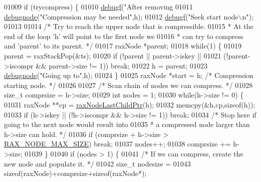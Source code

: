 \begin{DoxyCode}
{{{{{{{{{{{{{{{{01009     \textcolor{keywordflow}{if} (trycompress) \{
01010         \hyperlink{rax_8c_a10b215c81aa397dbc44adfb3e436befb}{debugf}(\textcolor{stringliteral}{"After removing %
01011         \hyperlink{rax_8c_a622b73fbdc398cdbfa8cc1fb87283cb4}{debugnode}(\textcolor{stringliteral}{"Compression may be needed"},h);
01012         \hyperlink{rax_8c_a10b215c81aa397dbc44adfb3e436befb}{debugf}(\textcolor{stringliteral}{"Seek start node\(\backslash\)n"});
01013 
01014         \textcolor{comment}{/* Try to reach the upper node that is compressible.}
01015 \textcolor{comment}{         * At the end of the loop 'h' will point to the first node we}
01016 \textcolor{comment}{         * can try to compress and 'parent' to its parent. */}
01017         raxNode *parent;
01018         \textcolor{keywordflow}{while}(1) \{
01019             parent = raxStackPop(&ts);
01020             \textcolor{keywordflow}{if} (!parent || parent->iskey ||
01021                 (!parent->iscompr && parent->size != 1)) \textcolor{keywordflow}{break};
01022             h = parent;
01023             \hyperlink{rax_8c_a622b73fbdc398cdbfa8cc1fb87283cb4}{debugnode}(\textcolor{stringliteral}{"Going up to"},h);
01024         \}
01025         raxNode *start = h; \textcolor{comment}{/* Compression starting node. */}
01026 
01027         \textcolor{comment}{/* Scan chain of nodes we can compress. */}
01028         size\_t comprsize = h->size;
01029         \textcolor{keywordtype}{int} nodes = 1;
01030         \textcolor{keywordflow}{while}(h->size != 0) \{
01031             raxNode **cp = \hyperlink{rax_8c_a2c5310b0d00672508a8f935a7109f4ce}{raxNodeLastChildPtr}(h);
01032             memcpy(&h,cp,\textcolor{keyword}{sizeof}(h));
01033             \textcolor{keywordflow}{if} (h->iskey || (!h->iscompr && h->size != 1)) \textcolor{keywordflow}{break};
01034             \textcolor{comment}{/* Stop here if going to the next node would result into}
01035 \textcolor{comment}{             * a compressed node larger than h->size can hold. */}
01036             \textcolor{keywordflow}{if} (comprsize + h->size > \hyperlink{rax_8h_a3b97483d00f37dd12e2d5efa4a9f23ce}{RAX\_NODE\_MAX\_SIZE}) \textcolor{keywordflow}{break};
01037             nodes++;
01038             comprsize += h->size;
01039         \}
01040         \textcolor{keywordflow}{if} (nodes > 1) \{
01041             \textcolor{comment}{/* If we can compress, create the new node and populate it. */}
01042             size\_t nodesize =
01043                 \textcolor{keyword}{sizeof}(raxNode)+comprsize+\textcolor{keyword}{sizeof}(raxNode*);
}}}}}}}}}}}}}}}}}
\end{DoxyCode}

